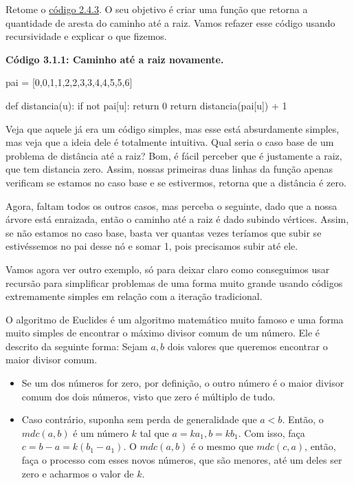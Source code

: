 \documentclass[11pt, a4paper]{article}
\begin{document}
    Retome o \hyperref[c2.4.3]{código 2.4.3}. O seu objetivo é criar uma função que retorna a quantidade de aresta do caminho até a raiz. Vamos refazer esse código usando recursividade e explicar o que fizemos.

\textbf{Código 3.1.1: Caminho até a raiz novamente.}

\begin{code}
pai = [0,0,1,1,2,2,3,3,4,4,5,5,6]

def distancia(u):
    if not pai[u]:
        return 0
    return distancia(pai[u]) + 1
\end{code}

Veja que aquele já era um código simples, mas esse está absurdamente simples, mas veja que a ideia dele é totalmente intuitiva. Qual seria o caso base de um problema de distância até a raiz? Bom, é fácil perceber que é justamente a raiz, que tem distancia zero. Assim, nossas primeiras duas linhas da função apenas verificam se estamos no caso base e se estivermos, retorna que a distância é zero.

Agora, faltam todos os outros casos, mas perceba o seguinte, dado que a nossa árvore está enraizada, então o caminho até a raiz é dado subindo vértices. Assim, se não estamos no caso base, basta ver quantas vezes teríamos que subir se estivéssemos no pai desse nó e somar 1, pois precisamos subir até ele.

Vamos agora ver outro exemplo, só para deixar claro como conseguimos usar recursão para simplificar problemas de uma forma muito grande usando códigos extremamente simples em relação com a iteração tradicional.

O algoritmo de Euclides é um algoritmo matemático muito famoso e uma forma muito simples de encontrar o máximo divisor comum de um número. Ele é descrito da seguinte forma: Sejam \(a,b\) dois valores que queremos encontrar o maior divisor comum.
\begin{itemize}
    \item Se um dos números for zero, por definição, o outro número é o maior divisor comum dos dois números, visto que zero é múltiplo de tudo.

    \item Caso contrário, suponha sem perda de generalidade que \(a<b\). Então, o \(mdc(a,b)\) é um número \(k\) tal que \(a=ka_1, b = kb_1\). Com isso, faça \(c=b-a=k(b_1-a_1)\). O \(mdc(a,b)\) é o mesmo que \(mdc(c,a)\), então, faça o processo com esses novos números, que são menores, até um deles ser zero e acharmos o valor de \(k\).
\end{itemize}
\end{document}
